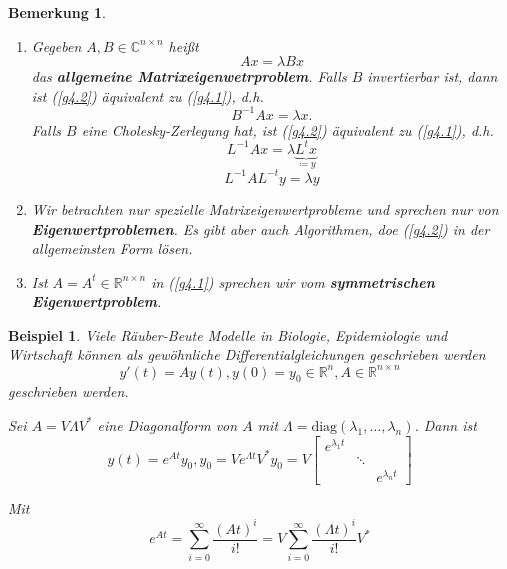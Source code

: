 \documentclass{book}
\newtheorem{remark}[algorithm]{Bemerkung}
\newtheorem{example}[algorithm]{Beispiel}
\def\C{\mathbb{C}}
\def\R{\mathbb{R}}
\begin{document}
            \begin{remark}\label{b4.2}
                \begin{enumerate}
                    \item Gegeben $A,B\in\C^{n\times n}$ heißt 
                        \begin{equation}\label{g4.2}
                            Ax=\lambda Bx
                        \end{equation}
                        das \textbf{allgemeine Matrixeigenwetrproblem}. Falls $B$ invertierbar ist, dann ist (\ref{g4.2}) äquivalent zu (\ref{g4.1}), d.h. 
                        \[B^{-1}Ax=\lambda x.\]
                        Falls $B$ eine Cholesky-Zerlegung hat, ist (\ref{g4.2}) äquivalent zu (\ref{g4.1}), d.h.
                        \[L^{-1}A x=\lambda \underbrace{L^tx}_{\coloneqq y}\]
                        \[L^{-1}AL^{-t}y=\lambda y\]
                    \item Wir betrachten nur spezielle Matrixeigenwertprobleme und sprechen nur von \textbf{Eigenwertproblemen}. Es gibt 
                        aber auch Algorithmen, doe (\ref{g4.2}) in der allgemeinsten Form lösen.
                    \item Ist $A=A^t\in\R^{n\times n}$ in (\ref{g4.1}) sprechen wir vom \textbf{symmetrischen Eigenwertproblem}. 
                \end{enumerate}
            \end{remark}

            \begin{example}\label{b4.4}
                Viele Räuber-Beute Modelle in Biologie, Epidemiologie und Wirtschaft können als gewöhnliche Differentialgleichungen geschrieben werden
                \begin{equation*}
                    y'(t)=Ay(t), y(0)=y_0\in\R^n,A\in\R^{n\times n}
                \end{equation*}
                geschrieben werden. 

                Sei $A=V\Lambda V^*$ eine Diagonalform von $A$ mit $\Lambda=\text{diag}(\lambda_1,\dots,\lambda_n)$. Dann ist 
                \begin{equation*}
                    y(t)=e^{At}y_0,y_0=Ve^{\Lambda t}V^*y_0=V\begin{bmatrix}
                        e^{\lambda_1t} & &\\
                        & \ddots & \\ 
                        && e^{\lambda_nt}
                    \end{bmatrix}
                \end{equation*}

                Mit \begin{equation*}
                    e^{At}=\sum_{i=0}^\infty \frac{(At)^i}{i!}=V\sum_{i=0}^\infty \frac{(\Lambda t)^i}{i!}V^*
                \end{equation*}

            \end{example}
\end{document}

